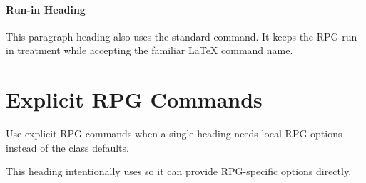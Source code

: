 \documentclass[
    11pt,
    colortheme=arcane,
    alignment=raggedright,
    columns=two,
]{rpgarticle}
\begin{document}
\paragraph{Run-in Heading} This paragraph heading also uses the standard command.
It keeps the RPG run-in treatment while accepting the familiar LaTeX command
name.

\section{Explicit RPG Commands}

Use explicit RPG commands when a single heading needs local RPG options instead
of the class defaults.


This heading intentionally uses \texttt{\string\RPGSubsection} so it can provide
RPG-specific options directly.
\end{document}
